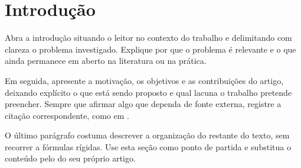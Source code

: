 \section{Introdução}
\label{sec:introducao}

Abra a introdução situando o leitor no contexto do trabalho e delimitando com
clareza o problema investigado. Explique por que o problema é relevante e o que
ainda permanece em aberto na literatura ou na prática.

Em seguida, apresente a motivação, os objetivos e as contribuições do artigo,
deixando explícito o que está sendo proposto e qual lacuna o trabalho pretende
preencher. Sempre que afirmar algo que dependa de fonte externa, registre a
citação correspondente, como em \cite{exemplo2024}.

O último parágrafo costuma descrever a organização do restante do texto, sem
recorrer a fórmulas rígidas. Use esta seção como ponto de partida e substitua o
conteúdo pelo do seu próprio artigo.
